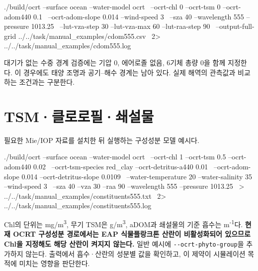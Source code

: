 \par\noindent\begin{minipage}{\linewidth}
\begin{ManualCode}
./build/ocrt --surface ocean --water-model ocrt \
  --ocrt-chl 0 --ocrt-tsm 0 --ocrt-adom440 0.1 \
  --ocrt-adom-slope 0.014 --wind-speed 3 \
  --sza 40 --wavelength 555 --pressure 1013.25 \
  --lut-vza-step 30 --lut-vza-max 60 --lut-raa-step 90 \
  --output-full-grid ../../task/manual_examples/cdom555.csv \
  2> ../../task/manual_examples/cdom555.log
\end{ManualCode}
\end{minipage}\par

대기가 없는 수중 경계 검증에는 기압 0, 에어로졸 없음, 6기체 총량 0을 함께 지정한다. 이 경우에도 태양 조명과 공기--해수 경계는 남아 있다. 실제 해역의 관측값과 비교하는 조건과는 구분한다.

\Needspace{17\baselineskip}
\section{TSM·클로로필·쇄설물}
\label{sec:auto:04_examples:8}
필요한 Mie/IOP 자료를 설치한 뒤 실행하는 구성성분 모델 예시다.


\par\noindent\begin{minipage}{\linewidth}
\begin{ManualCode}
./build/ocrt --surface ocean --water-model ocrt \
  --ocrt-chl 1 --ocrt-tsm 0.5 --ocrt-adom440 0.02 \
  --ocrt-tsm-species red_clay --ocrt-detritus-a440 0.01 \
  --ocrt-adom-slope 0.014 --ocrt-detritus-slope 0.0109 \
  --water-temperature 20 --water-salinity 35 --wind-speed 3 \
  --sza 40 --vza 30 --raa 90 --wavelength 555 --pressure 1013.25 \
  > ../../task/manual_examples/constituents555.txt \
  2> ../../task/manual_examples/constituents555.log
\end{ManualCode}
\end{minipage}\par

Chl의 단위는 mg/m\textsuperscript{3}, 무기 TSM은 g/m\textsuperscript{3}, aDOM과 쇄설물의 기준 흡수는 m\textsuperscript{-}\textsuperscript{1}다. \textbf{현재 OCRT 구성성분 경로에서는 EAP 식물플랑크톤 산란이 비활성화되어 있으므로 Chl을 지정해도 해당 산란이 켜지지 않는다.} 일반 예시에 \texttt{-\allowbreak{}-\allowbreak{}ocrt-\allowbreak{}phyto-\allowbreak{}group}을 추가하지 않는다. 출력에서 흡수·산란의 성분별 값을 확인하고, 이 제약이 시뮬레이션 목적에 미치는 영향을 판단한다.

